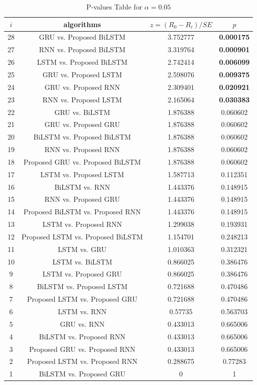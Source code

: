 \documentclass[sn-mathphys,Numbered]{sn-jnl}
\theoremstyle{thmstyleone}
\theoremstyle{thmstyletwo}
\theoremstyle{thmstylethree}
\begin{document}
\begin{table}[!htbp]
\centering\scriptsize
\begin{tabular}{cccc}
\hline
$i$&algorithms&$z=(R_0 - R_i)/SE$&$p$\\
\hline28&GRU vs. Proposed BiLSTM&3.752777&\textbf{0.000175}\\
27&RNN vs. Proposed BiLSTM&3.319764&\textbf{0.000901}\\
26&LSTM vs. Proposed BiLSTM&2.742414&\textbf{0.006099}\\
25&GRU vs. Proposed LSTM&2.598076&\textbf{0.009375}\\
24&GRU vs. Proposed RNN&2.309401&\textbf{0.020921}\\
23&RNN vs. Proposed LSTM&2.165064&\textbf{0.030383}\\
22&GRU vs. BiLSTM&1.876388&0.060602\\
21&GRU vs. Proposed GRU&1.876388&0.060602\\
20&BiLSTM vs. Proposed BiLSTM&1.876388&0.060602\\
19&RNN vs. Proposed RNN&1.876388&0.060602\\
18&Proposed GRU vs. Proposed BiLSTM&1.876388&0.060602\\
17&LSTM vs. Proposed LSTM&1.587713&0.112351\\
16&BiLSTM vs. RNN&1.443376&0.148915\\
15&RNN vs. Proposed GRU&1.443376&0.148915\\
14&Proposed BiLSTM vs. Proposed RNN&1.443376&0.148915\\
13&LSTM vs. Proposed RNN&1.299038&0.193931\\
12&Proposed LSTM vs. Proposed BiLSTM&1.154701&0.248213\\
11&LSTM vs. GRU&1.010363&0.312321\\
10&LSTM vs. BiLSTM&0.866025&0.386476\\
9&LSTM vs. Proposed GRU&0.866025&0.386476\\
8&BiLSTM vs. Proposed LSTM&0.721688&0.470486\\
7&Proposed LSTM vs. Proposed GRU&0.721688&0.470486\\
6&LSTM vs. RNN&0.57735&0.563703\\
5&GRU vs. RNN&0.433013&0.665006\\
4&BiLSTM vs. Proposed RNN&0.433013&0.665006\\
3&Proposed GRU vs. Proposed RNN&0.433013&0.665006\\
2&Proposed LSTM vs. Proposed RNN&0.288675&0.77283\\
1&BiLSTM vs. Proposed GRU&0&1\\
\hline
\end{tabular}
\caption{P-values Table for $\alpha=0.05$}
\label{tab:pvalue}
\end{table}
\pagebreak
\end{document}
